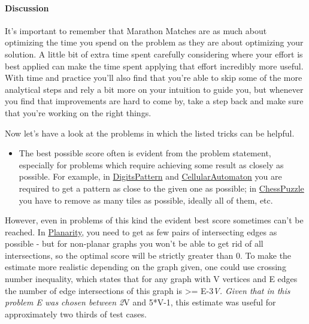 \documentclass[]{article}
\providecommand{\tightlist}{%
  \setlength{\itemsep}{0pt}\setlength{\parskip}{0pt}}
\let\oldparagraph\paragraph
\renewcommand{\paragraph}[1]{\oldparagraph{#1}\mbox{}}
\begin{document}
\hypertarget{discussion-3}{%
\paragraph{Discussion}\label{discussion-3}}

It's important to remember that Marathon Matches are as much about
optimizing the time you spend on the problem as they are about
optimizing your solution. A little bit of extra time spent carefully
considering where your effort is best applied can make the time spent
applying that effort incredibly more useful. With time and practice
you'll also find that you're able to skip some of the more analytical
steps and rely a bit more on your intuition to guide you, but whenever
you find that improvements are hard to come by, take a step back and
make sure that you're working on the right things.

Now let's have a look at the problems in which the listed tricks can be
helpful.

\begin{itemize}
\tightlist
\item
  The best possible score often is evident from the problem statement,
  especially for problems which require achieving some result as closely
  as possible. For example, in
  \href{http://www.topcoder.com/longcontest/?module=ViewProblemStatement\&rd=14412\&pm=11123}{DigitsPattern}
  and
  \href{http://www.topcoder.com/longcontest/?module=ViewProblemStatement\&rd=14339\&pm=10989}{CellularAutomaton}
  you are required to get a pattern as close to the given one as
  possible; in
  \href{http://www.topcoder.com/longcontest/?module=ViewProblemStatement\&rd=14195\&pm=10728}{ChessPuzzle}
  you have to remove as many tiles as possible, ideally all of them,
  etc.
\end{itemize}

However, even in problems of this kind the evident best score sometimes
can't be reached. In
\href{http://www.topcoder.com/longcontest/?module=ViewProblemStatement\&rd=14300\&pm=10942}{Planarity},
you need to get as few pairs of intersecting edges as possible - but for
non-planar graphs you won't be able to get rid of all intersections, so
the optimal score will be strictly greater than 0. To make the estimate
more realistic depending on the graph given, one could use crossing
number inequality, which states that for any graph with V vertices and E
edges the number of edge intersections of this graph is \textgreater{}=
E-3\emph{V. Given that in this problem E was chosen between 2}V and
5*V-1, this estimate was useful for approximately two thirds of test
cases.
\end{document}
